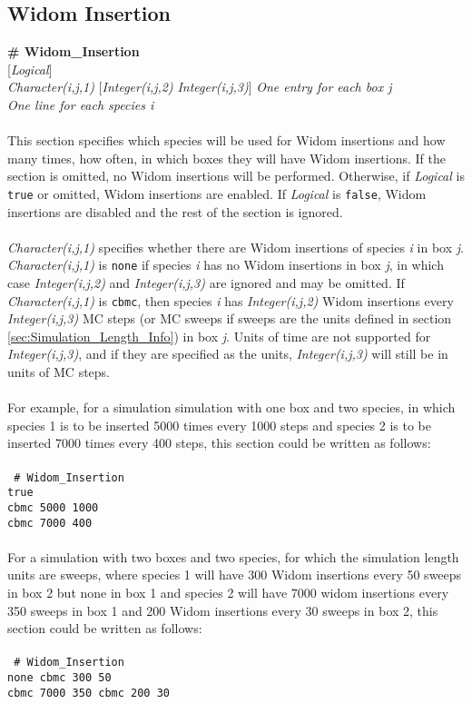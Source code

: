 \subsection{Widom Insertion}\label{sec:Widom_Info}
{\bf \# Widom\_Insertion} \\
{[}{\it Logical}] \\
{\it Character(i,j,1)} [{\it Integer(i,j,2)} {\it Integer(i,j,3)}] {\it *One entry for each box j} \\
{\it *One line for each species i} \\ \\
%
This section specifies which species will be used for Widom insertions and how many times, how often, in which boxes they will have Widom insertions.  If the section is omitted, no Widom insertions will be performed.  Otherwise, if {\it Logical} is \texttt{true} or omitted, Widom insertions are enabled.  If {\it Logical} is \texttt{false}, Widom insertions are disabled and the rest of the section is ignored.  \\ \\
%
{\it Character(i,j,1)} specifies whether there are Widom insertions of species {\it i} in box {\it j}.  {\it Character(i,j,1)} is \texttt{none} if species {\it i} has no Widom insertions in box {\it j}, in which case {\it Integer(i,j,2)} and {\it Integer(i,j,3)} are ignored and may be omitted.  If {\it Character(i,j,1)} is \texttt{cbmc}, then species {\it i} has {\it Integer(i,j,2)} Widom insertions every {\it Integer(i,j,3)} MC steps (or MC sweeps if sweeps are the units defined in section \ref{sec:Simulation_Length_Info}) in box {\it j}.  Units of time are not supported for {\it Integer(i,j,3)}, and if they are specified as the units, {\it Integer(i,j,3)} will still be in units of MC steps. \\ \\
%
For example, for a simulation simulation with one box and two species, in which species 1 is to be inserted 5000 times every 1000 steps and species 2 is to be inserted 7000 times every 400 steps, this section could be written as follows:\\ \\
\texttt{
\# Widom\_Insertion \\
true \\
cbmc 5000 1000 \\
cbmc 7000 400 \\} \\
%
For a simulation with two boxes and two species, for which the simulation length units are sweeps, where species 1 will have 300 Widom insertions every 50 sweeps in box 2 but none in box 1 and species 2 will have 7000 widom insertions every 350 sweeps in box 1 and 200 Widom insertions every 30 sweeps in box 2, this section could be written as follows: \\ \\
\texttt{
\# Widom\_Insertion \\
none cbmc 300 50 \\
cbmc 7000 350 cbmc 200 30 \\} \\





